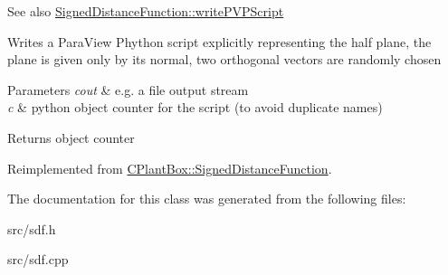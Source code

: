 \begin{DoxySeeAlso}{See also}
\hyperlink{classCPlantBox_1_1SignedDistanceFunction_a0098fb469c9be5557d5593cec9e76d2a}{Signed\+Distance\+Function\+::write\+P\+V\+P\+Script}
\end{DoxySeeAlso}
Writes a Para\+View Phython script explicitly representing the half plane, the plane is given only by its normal, two orthogonal vectors are randomly chosen


\begin{DoxyParams}{Parameters}
{\em cout} & e.\+g. a file output stream \\
\hline
{\em c} & python object counter for the script (to avoid duplicate names) \\
\hline
\end{DoxyParams}
\begin{DoxyReturn}{Returns}
object counter 
\end{DoxyReturn}


Reimplemented from \hyperlink{classCPlantBox_1_1SignedDistanceFunction_a0098fb469c9be5557d5593cec9e76d2a}{C\+Plant\+Box\+::\+Signed\+Distance\+Function}.



The documentation for this class was generated from the following files\+:\begin{DoxyCompactItemize}
\item 
src/sdf.\+h\item 
src/sdf.\+cpp\end{DoxyCompactItemize}

